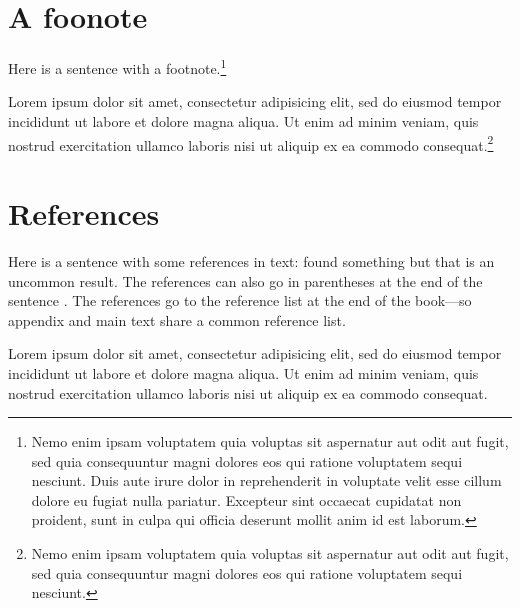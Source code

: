 \section{A foonote}

Here is a sentence with a footnote.\footnote{Nemo enim ipsam voluptatem quia voluptas sit aspernatur aut odit aut fugit, sed quia consequuntur magni dolores eos qui ratione voluptatem sequi nesciunt. Duis aute irure dolor in reprehenderit in voluptate velit esse
cillum dolore eu fugiat nulla pariatur. Excepteur sint occaecat cupidatat non
proident, sunt in culpa qui officia deserunt mollit anim id est laborum.}

Lorem ipsum dolor sit amet, consectetur adipisicing elit, sed do eiusmod tempor incididunt ut labore et dolore magna aliqua. Ut enim ad minim veniam,
quis nostrud exercitation ullamco laboris nisi ut aliquip ex ea commodo
consequat.\footnote{Nemo enim ipsam voluptatem quia voluptas sit aspernatur aut odit aut fugit, sed quia consequuntur magni dolores eos qui ratione voluptatem sequi nesciunt.}

\section{References}\label{a:subappendix}

Here is a sentence with some references in text: \citet{MS19,MS21} found something but that is an uncommon result. The references can also go in parentheses at the end of the sentence \citep{MS21,MS22}. The references go to the reference list at the end of the book---so appendix and main text share a common reference list.

Lorem ipsum dolor sit amet, consectetur adipisicing elit, sed do eiusmod
tempor incididunt ut labore et dolore magna aliqua. Ut enim ad minim veniam,
quis nostrud exercitation ullamco laboris nisi ut aliquip ex ea commodo
consequat.
